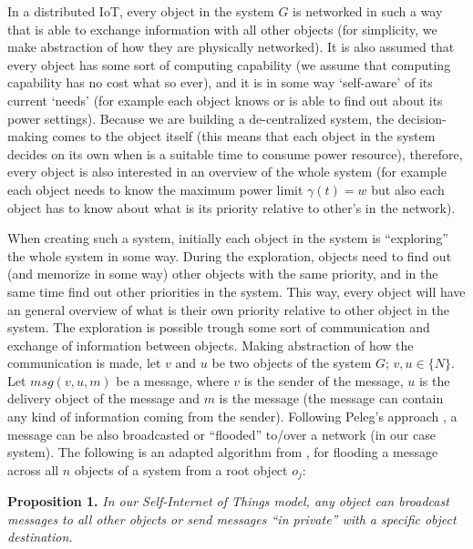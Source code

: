 \documentclass[../main/Self-Stabilization.tex]{subfiles}
\begin{document}
In a distributed IoT, every object in the system $G$ is networked in such a way that is able to exchange information with all other objects (for simplicity, we make abstraction of how they are physically networked). It is also assumed that every object has some sort of computing capability (we assume that computing capability has no cost what so ever), and it is in some way `self-aware' of its current `needs' (for example each object knows or is able to find out about its power settings). Because we are building a de-centralized system, the decision-making comes to the object itself (this means that each object in the system decides on its own when is a suitable time to consume power resource), therefore, every object is also interested in an overview of the whole system (for example each object needs to know the maximum power limit $\gamma(t)= w$ but also each object has to know about what is its priority relative to other's in the network).

When creating such a system, initially each object in the system is ``exploring'' the whole system in some way. During the exploration, objects need to find out (and memorize in some way) other objects with the same priority, and in the same time find out other priorities in the system. This way, every object will have an general overview of what is their own priority relative to other object in the system. The exploration is possible trough some sort of communication and exchange of information between objects. Making abstraction of how the communication is made, let $v$ and $u$ be two objects of the system $G$; $v,u \in\{N\}$. Let $msg(v,u,m)$ be a message, where $v$ is the sender of the message, $u$ is the delivery object of the message and $m$ is the message (the message can contain any kind of information coming from the sender). Following Peleg's approach \cite{peleg2000distributed}, a message can be also broadcasted or ``flooded'' to/over a network (in our case system). The following is an adapted algorithm from \cite{peleg2000distributed}, for flooding a message across all $n$ objects of a system from a root object $o_{j}$:

\textbf{Proposition 1.} \emph{In our Self-Internet of Things model, any object can broadcast messages to all other objects or send messages ``in private'' with a specific object destination.}
\end{document}
